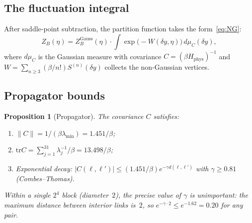 \documentclass[11pt]{article}
\newtheorem{proposition}[theorem]{Proposition}
\theoremstyle{definition}
\newcommand{\tr}{\mathrm{tr}}
\begin{document}
\subsection{The fluctuation integral}

After saddle-point subtraction, the partition function takes the
form~\eqref{eq:NG}:
\begin{equation}
Z_B(\eta)=Z_B^{\mathrm{Gauss}}(\eta)\cdot
\int\exp\bigl(-W(\delta y,\eta)\bigr)\,d\mu_C(\delta y),
\end{equation}
where $d\mu_C$ is the Gaussian measure with covariance
$C=(\beta H_{\mathrm{phys}})^{-1}$ and $W=\sum_{n\ge 3}
(\beta/n!)S^{(n)}(\delta y)$ collects the non-Gaussian vertices.

\subsection{Propagator bounds}

\begin{proposition}[Propagator]\label{prop:propagator}
The covariance $C$ satisfies:
\begin{enumerate}[nosep,label=(\roman*)]
\item $\|C\|=1/(\beta\lambda_{\min})=1.451/\beta$;
\item $\tr C=\sum_{j=1}^{31}\lambda_j^{-1}/\beta=13.498/\beta$;
\item Exponential decay:
$|C(\ell,\ell')|\le(1.451/\beta)e^{-\gamma d(\ell,\ell')}$
with $\gamma\ge 0.81$ (Combes--Thomas).
\end{enumerate}
Within a single $2^4$ block (diameter~$2$), the precise value of
$\gamma$ is unimportant: the maximum distance between interior links
is~$2$, so $e^{-\gamma\cdot 2}\le e^{-1.62}=0.20$ for any pair.
\end{proposition}
\end{document}
